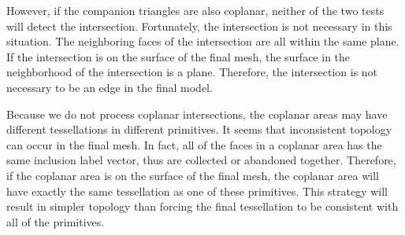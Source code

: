 
However, if the companion triangles are also coplanar, neither of the two tests will detect the intersection. Fortunately, the intersection is not necessary in this situation. The neighboring faces of the intersection are all within the same plane. If the intersection is on the surface of the final mesh, the surface in the neighborhood of the intersection is a plane. Therefore, the intersection is not necessary to be an edge in the final model.

Because we do not process coplanar intersections, the coplanar areas may have different tessellations in different primitives. It seems that inconsistent topology can occur in the final mesh. In fact, all of the faces in a coplanar area has the same inclusion label vector, thus are collected or abandoned together. Therefore, if the coplanar area is on the surface of the final mesh, the coplanar area will have exactly the same tessellation as one of these primitives. This strategy will result in simpler topology than forcing the final tessellation to be consistent with all of the primitives.
